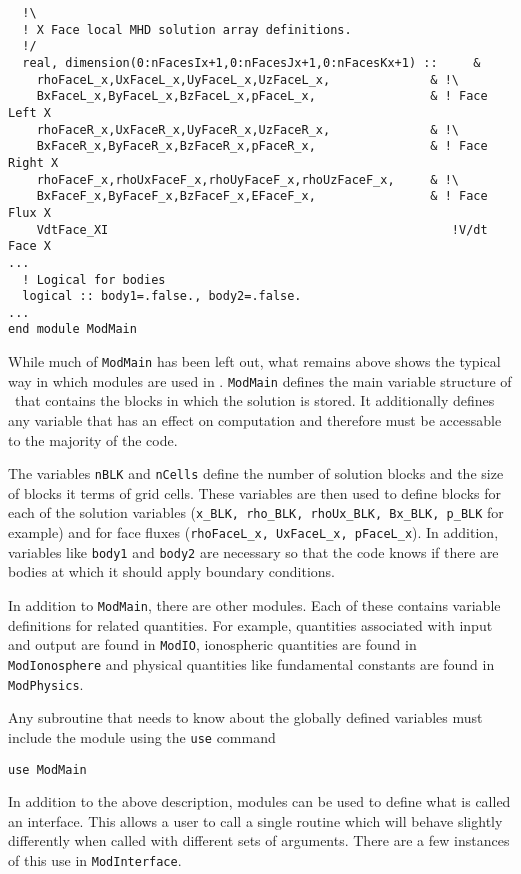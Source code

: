 \begin{verbatim}
  !\
  ! X Face local MHD solution array definitions.
  !/
  real, dimension(0:nFacesIx+1,0:nFacesJx+1,0:nFacesKx+1) ::     &
    rhoFaceL_x,UxFaceL_x,UyFaceL_x,UzFaceL_x,              & !\
    BxFaceL_x,ByFaceL_x,BzFaceL_x,pFaceL_x,                & ! Face Left X
    rhoFaceR_x,UxFaceR_x,UyFaceR_x,UzFaceR_x,              & !\
    BxFaceR_x,ByFaceR_x,BzFaceR_x,pFaceR_x,                & ! Face Right X
    rhoFaceF_x,rhoUxFaceF_x,rhoUyFaceF_x,rhoUzFaceF_x,     & !\
    BxFaceF_x,ByFaceF_x,BzFaceF_x,EFaceF_x,                & ! Face Flux X
    VdtFace_XI                                                !V/dt Face X
...
  ! Logical for bodies
  logical :: body1=.false., body2=.false.
...
end module ModMain
\end{verbatim}
While much of {\tt ModMain} has been left out, what remains above
shows the typical way in which modules are used in \BATSRUS.  {\tt ModMain}
defines the main variable structure of \BATSRUS\ that contains the
blocks in which the solution is stored. It additionally defines any
variable that has an effect on computation and therefore must
be accessable to the majority of the code.  

The variables {\tt nBLK} and {\tt nCells} define the number of solution
blocks and the size of blocks it terms of grid cells.  
These variables are then used to define blocks for each of
the solution variables ({\tt x\_BLK, rho\_BLK, rhoUx\_BLK, Bx\_BLK, p\_BLK} 
for example) and for face fluxes ({\tt rhoFaceL\_x, UxFaceL\_x, pFaceL\_x}).
In addition, variables like {\tt body1} and {\tt body2} are necessary so that
the code knows if there are bodies at which it should apply boundary
conditions.

In addition to {\tt ModMain}, there are other modules.  Each of these contains
variable definitions for related quantities.  For example, quantities 
associated
with input and output are found in {\tt ModIO}, ionospheric quantities are
found in {\tt ModIonosphere} and physical quantities like fundamental
constants are found in {\tt ModPhysics}.

Any subroutine that needs to know about the globally defined 
variables must include the module using the {\tt use}
command
\begin{verbatim}
use ModMain
\end{verbatim}

In addition to the above description, modules can be used to define
what is called an interface.  This allows a user to call a single 
routine which will behave slightly differently when called
with different sets of arguments.  There are a few instances of this
use in {\tt ModInterface}.

